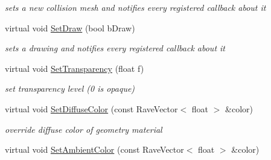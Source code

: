 \begin{DoxyCompactItemize}
\begin{DoxyCompactList}\small\item\em sets a new collision mesh and notifies every registered callback about it \item\end{DoxyCompactList}\item 
\hypertarget{classOpenRAVE_1_1KinBody_1_1Link_1_1GEOMPROPERTIES_aca7864afdc94867792c10f09e53735e6}{
virtual void \hyperlink{classOpenRAVE_1_1KinBody_1_1Link_1_1GEOMPROPERTIES_aca7864afdc94867792c10f09e53735e6}{SetDraw} (bool bDraw)}
\label{classOpenRAVE_1_1KinBody_1_1Link_1_1GEOMPROPERTIES_aca7864afdc94867792c10f09e53735e6}

\begin{DoxyCompactList}\small\item\em sets a drawing and notifies every registered callback about it \item\end{DoxyCompactList}\item 
\hypertarget{classOpenRAVE_1_1KinBody_1_1Link_1_1GEOMPROPERTIES_a6b8232d86a71abe734ff516888b3d2f0}{
virtual void \hyperlink{classOpenRAVE_1_1KinBody_1_1Link_1_1GEOMPROPERTIES_a6b8232d86a71abe734ff516888b3d2f0}{SetTransparency} (float f)}
\label{classOpenRAVE_1_1KinBody_1_1Link_1_1GEOMPROPERTIES_a6b8232d86a71abe734ff516888b3d2f0}

\begin{DoxyCompactList}\small\item\em set transparency level (0 is opaque) \item\end{DoxyCompactList}\item 
\hypertarget{classOpenRAVE_1_1KinBody_1_1Link_1_1GEOMPROPERTIES_ace7920853d82ecfa046fc6195104a529}{
virtual void \hyperlink{classOpenRAVE_1_1KinBody_1_1Link_1_1GEOMPROPERTIES_ace7920853d82ecfa046fc6195104a529}{SetDiffuseColor} (const RaveVector$<$ float $>$ \&color)}
\label{classOpenRAVE_1_1KinBody_1_1Link_1_1GEOMPROPERTIES_ace7920853d82ecfa046fc6195104a529}

\begin{DoxyCompactList}\small\item\em override diffuse color of geometry material \item\end{DoxyCompactList}\item 
\hypertarget{classOpenRAVE_1_1KinBody_1_1Link_1_1GEOMPROPERTIES_ad1572d41cb6d899e83ce4ba952ae93d4}{
virtual void \hyperlink{classOpenRAVE_1_1KinBody_1_1Link_1_1GEOMPROPERTIES_ad1572d41cb6d899e83ce4ba952ae93d4}{SetAmbientColor} (const RaveVector$<$ float $>$ \&color)}
\label{classOpenRAVE_1_1KinBody_1_1Link_1_1GEOMPROPERTIES_ad1572d41cb6d899e83ce4ba952ae93d4}


\end{DoxyCompactItemize}
